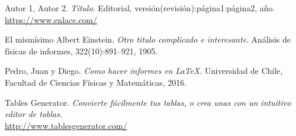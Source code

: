 		\lipsum[115]
		\vspace{\defaultnewlinesize}
		\lipsum[4]

\newpage
\begin{thebibliography}{99}
	
		 Autor 1, Autor 2.
		\textit{Título}.
		Editorial, versión(revisión):página1:página2, año.
		\\\url{https://www.enlace.com/}
		
		 El mismísimo Albert Einstein. 
		\textit{Otro titulo complicado e interesante}. 
		Análisis de físicas de informes, 322(10):891–921, 1905.
	
		 Pedro, Juan y Diego. 
		\textit{Como hacer informes en \LaTeX}. 
		Universidad de Chile, Facultad de Ciencias Físicas y Matemáticas, 2016.
	
		 Tables Generator.
		\textit{Convierte fácilmente tus tablas, o crea unas con un intuitivo editor de tablas.}
		\\\url{http://www.tablesgenerator.com/}
	
\end{thebibliography}